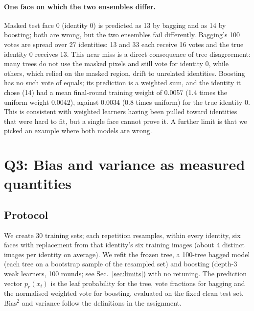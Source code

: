 \documentclass[10pt,twocolumn,letterpaper]{article}
\begin{document}
\paragraph{One face on which the two ensembles differ.}
Masked test face 0 (identity 0) is predicted as 13 by bagging and as 14 by boosting; both are wrong, but the two ensembles fail differently. Bagging's 100 votes are spread over 27 identities: 13 and 33 each receive 16 votes and the true identity 0 receives 13. This near miss is a direct consequence of tree disagreement: many trees do not use the masked pixels and still vote for identity 0, while others, which relied on the masked region, drift to unrelated identities. Boosting has no such vote of equals; its prediction is a weighted sum, and the identity it chose (14) had a mean final-round training weight of 0.0057 (1.4 times the uniform weight 0.0042), against 0.0034 (0.8 times uniform) for the true identity 0. This is consistent with weighted learners having been pulled toward identities that were hard to fit, but a single face cannot prove it. A further limit is that we picked an example where both models are wrong.

\section{Q3: Bias and variance as measured quantities}

\subsection{Protocol}
We create 30 training sets; each repetition resamples, within every identity, six faces with replacement from that identity's six training images (about 4 distinct images per identity on average). We refit the frozen tree, a 100-tree bagged model (each tree on a bootstrap sample of the resampled set) and boosting (depth-3 weak learners, 100 rounds; see Sec.~\ref{sec:limits}) with no retuning. The prediction vector $p_r(x_i)$ is the leaf probability for the tree, vote fractions for bagging and the normalised weighted vote for boosting, evaluated on the fixed clean test set. $\mathrm{Bias}^2$ and variance follow the definitions in the assignment.
\end{document}
